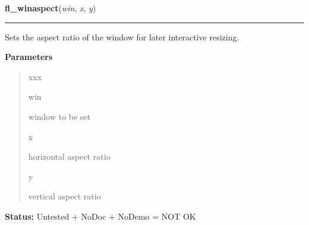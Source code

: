 \hspace{.8\funcindent}\begin{boxedminipage}{\funcwidth}

    \raggedright \textbf{fl\_winaspect}(\textit{win}, \textit{x}, \textit{y})

    \vspace{-1.5ex}

    \rule{\textwidth}{0.5\fboxrule}
\setlength{\parskip}{2ex}
    Sets the aspect ratio of the window for later interactive resizing.

\setlength{\parskip}{1ex}
      \textbf{Parameters}
      \vspace{-1ex}

      \begin{quote}
        \begin{Ventry}{xxx}

          \item[win]

          window to be set

          \item[x]

          horizontal aspect ratio

          \item[y]

          vertical aspect ratio

        \end{Ventry}

      \end{quote}

\textbf{Status:} Untested + NoDoc + NoDemo = NOT OK



    \end{boxedminipage}

    \label{xformslib:library:fl_reset_winconstraints}

    \vspace{0.5ex}

